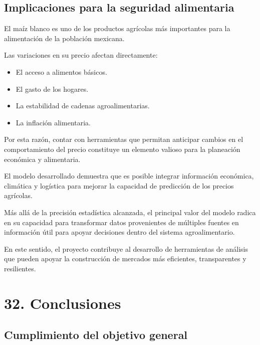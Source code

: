 \documentclass[11pt]{article}
\providecommand{\tightlist}{%
      \setlength{\itemsep}{0pt}\setlength{\parskip}{0pt}}
\begin{document}
\hypertarget{implicaciones-para-la-seguridad-alimentaria}{%
\subsection{Implicaciones para la seguridad
alimentaria}\label{implicaciones-para-la-seguridad-alimentaria}}

El maíz blanco es uno de los productos agrícolas más importantes para la
alimentación de la población mexicana.

Las variaciones en su precio afectan directamente:

\begin{itemize}
\tightlist
\item
  El acceso a alimentos básicos.
\item
  El gasto de los hogares.
\item
  La estabilidad de cadenas agroalimentarias.
\item
  La inflación alimentaria.
\end{itemize}

Por esta razón, contar con herramientas que permitan anticipar cambios
en el comportamiento del precio constituye un elemento valioso para la
planeación económica y alimentaria.

El modelo desarrollado demuestra que es posible integrar información
económica, climática y logística para mejorar la capacidad de predicción
de los precios agrícolas.

Más allá de la precisión estadística alcanzada, el principal valor del
modelo radica en su capacidad para transformar datos provenientes de
múltiples fuentes en información útil para apoyar decisiones dentro del
sistema agroalimentario.

En este sentido, el proyecto contribuye al desarrollo de herramientas de
análisis que pueden apoyar la construcción de mercados más eficientes,
transparentes y resilientes.

    \hypertarget{conclusiones}{%
\section{32. Conclusiones}\label{conclusiones}}

\hypertarget{cumplimiento-del-objetivo-general}{%
\subsection{Cumplimiento del objetivo
general}\label{cumplimiento-del-objetivo-general}}
\end{document}
